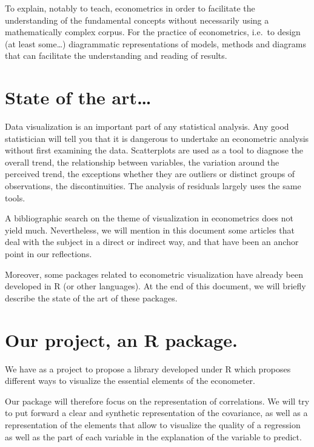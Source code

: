 \documentclass[
]{report}
\begin{document}
To explain, notably to teach, econometrics in order to facilitate the understanding of the fundamental concepts without necessarily using a mathematically complex corpus.
For the practice of econometrics, i.e.~to design (at least some\ldots) diagrammatic representations of models, methods and diagrams that can facilitate the understanding and reading of results.

\hypertarget{state-of-the-art}{%
\section{State of the art\ldots{}}\label{state-of-the-art}}

Data visualization is an important part of any statistical analysis. Any good statistician will tell you that it is dangerous to undertake an econometric analysis without first examining the data.
Scatterplots are used as a tool to diagnose the overall trend, the relationship between variables, the variation around the perceived trend, the exceptions whether they are outliers or distinct groups of observations, the discontinuities. The analysis of residuals largely uses the same tools.

A bibliographic search on the theme of visualization in econometrics does not yield much. Nevertheless, we will mention in this document some articles that deal with the subject in a direct or indirect way, and that have been an anchor point in our reflections.

Moreover, some packages related to econometric visualization have already been developed in R (or other languages). At the end of this document, we will briefly describe the state of the art of these packages.

\hypertarget{our-project-an-r-package.}{%
\section{Our project, an R package.}\label{our-project-an-r-package.}}

We have as a project to propose a library developed under R which proposes different ways to visualize the essential elements of the econometer.

Our package will therefore focus on the representation of correlations. We will try to put forward a clear and synthetic representation of the covariance, as well as a representation of the elements that allow to visualize the quality of a regression as well as the part of each variable in the explanation of the variable to predict.
\end{document}
